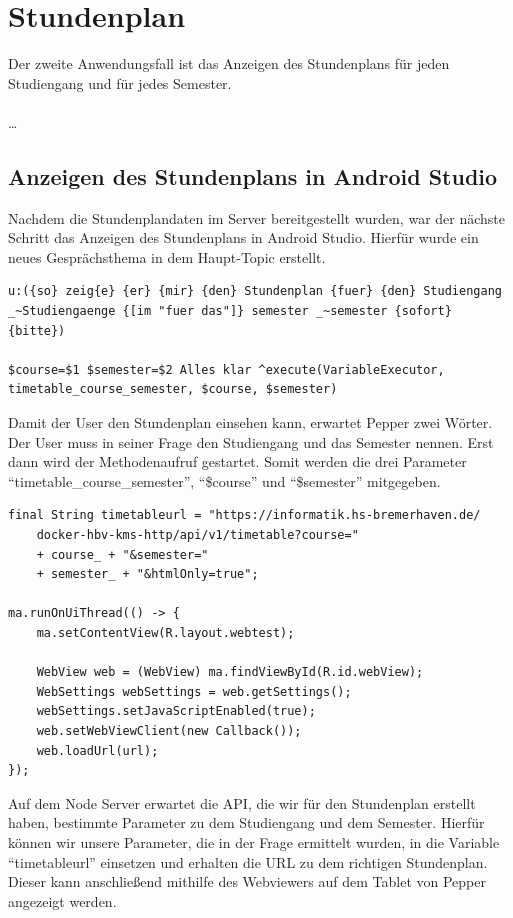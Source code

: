 \section{Stundenplan}

Der zweite Anwendungsfall ist das Anzeigen des Stundenplans für jeden Studiengang und für jedes Semester. 
\\\\
…
\\
\subsection{Anzeigen des Stundenplans in Android Studio}

Nachdem die Stundenplandaten im Server bereitgestellt wurden, war der nächste Schritt das Anzeigen des Stundenplans in Android Studio. 
Hierfür wurde ein neues Gesprächsthema in dem Haupt-Topic erstellt.

\begin{lstlisting}
u:({so} zeig{e} {er} {mir} {den} Stundenplan {fuer} {den} Studiengang 
_~Studiengaenge {[im "fuer das"]} semester _~semester {sofort} {bitte})

$course=$1 $semester=$2 Alles klar ^execute(VariableExecutor, 
timetable_course_semester, $course, $semester)
\end{lstlisting}

Damit der User den Stundenplan einsehen kann, erwartet Pepper zwei Wörter. Der User muss in seiner Frage den Studiengang und das Semester 
nennen. Erst dann wird der Methodenaufruf gestartet. Somit werden die drei Parameter ``timetable\_course\_semester'', 
``\$course'' und ``\$semester'' mitgegeben.

\begin{lstlisting}
final String timetableurl = "https://informatik.hs-bremerhaven.de/
    docker-hbv-kms-http/api/v1/timetable?course="
    + course_ + "&semester="
    + semester_ + "&htmlOnly=true";

ma.runOnUiThread(() -> {
	ma.setContentView(R.layout.webtest);

	WebView web = (WebView) ma.findViewById(R.id.webView);
	WebSettings webSettings = web.getSettings();
	webSettings.setJavaScriptEnabled(true);
	web.setWebViewClient(new Callback());
	web.loadUrl(url);
});
\end{lstlisting}

Auf dem Node Server erwartet die API, die wir für den Stundenplan erstellt haben, bestimmte Parameter zu dem Studiengang und dem Semester. 
Hierfür können wir unsere Parameter, die in der Frage ermittelt wurden, in die Variable ``timetableurl'' einsetzen und erhalten 
die URL zu dem richtigen Stundenplan. Dieser kann anschließend mithilfe des Webviewers auf dem Tablet von Pepper angezeigt werden. 

